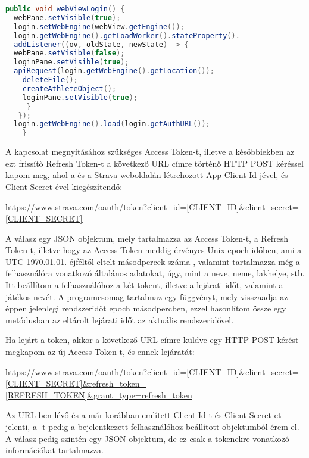 \begin{lstlisting}[language=Java]
public void webViewLogin() { 
  webPane.setVisible(true); 
  login.setWebEngine(webView.getEngine()); 
  login.getWebEngine().getLoadWorker().stateProperty(). 
  addListener((ov, oldState, newState) -> { 
  webPane.setVisible(false); 
  loginPane.setVisible(true);
  apiRequest(login.getWebEngine().getLocation()); 
    deleteFile(); 
    createAthleteObject(); 
    loginPane.setVisible(true); 
     } 
   }); 
  login.getWebEngine().load(login.getAuthURL()); 
    } 
\end{lstlisting}
 

A kapcsolat megnyitásához szükséges Access Token-t, illetve a későbbiekben az ezt frissítő Refresh Token-t a következő URL címre történő HTTP POST kéréssel kapom meg, ahol a \CodeName{[CLIENT\_ID]} és  a Strava weboldalán létrehozott App Client Id-jével, és Client Secret-ével kiegészítendő:

\url{
https://www.strava.com/oauth/token?client_id=[CLIENT_ID]&client_secret=[CLIENT_SECRET] 
}

A válasz egy JSON objektum, mely tartalmazza az Access Token-t, a Refresh Token-t, illetve hogy az Access Token meddig érvényes Unix epoch időben, ami a UTC 1970.01.01. éjféltől eltelt másodpercek száma , valamint tartalmazza még a felhasználóra vonatkozó általános adatokat, úgy, mint a neve, neme, lakhelye, stb.
Itt beállítom a felhasználóhoz a két tokent, illetve a lejárati időt, valamint a játékos nevét.
A  programcsomag tartalmaz egy  függvényt, mely visszaadja az éppen jelenlegi rendszeridőt epoch másodpercben, ezzel hasonlítom össze egy metódusban az eltárolt lejárati időt az aktuális rendszeridővel. 

Ha lejárt a token, akkor a következő URL címre küldve egy HTTP POST kérést megkapom az új Access Token-t, és ennek lejáratát:

\url{
https://www.strava.com/oauth/token?client_id=[CLIENT_ID]&client_secret=[CLIENT_SECRET]&refresh_token=[REFRESH_TOKEN]&grant_type=refresh_token 
}

Az URL-ben lévő \CodeName{[CLIENT\_ID]} és  a már korábban említett Client Id-t és Client Secret-et jelenti, a -t pedig a bejelentkezett felhasználóhoz beállított  objektumból érem el.
A válasz pedig szintén egy JSON objektum, de ez csak a tokenekre vonatkozó információkat tartalmazza. 

